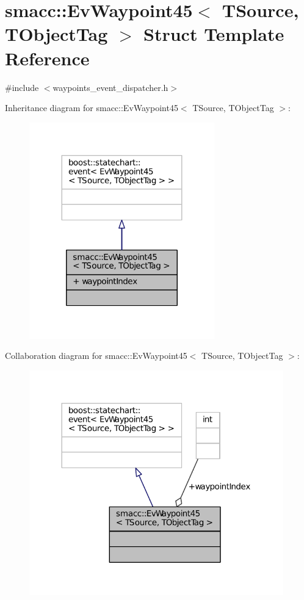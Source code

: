 \hypertarget{structsmacc_1_1EvWaypoint45}{}\section{smacc\+:\+:Ev\+Waypoint45$<$ T\+Source, T\+Object\+Tag $>$ Struct Template Reference}
\label{structsmacc_1_1EvWaypoint45}


{\ttfamily \#include $<$waypoints\+\_\+event\+\_\+dispatcher.\+h$>$}



Inheritance diagram for smacc\+:\+:Ev\+Waypoint45$<$ T\+Source, T\+Object\+Tag $>$\+:
\nopagebreak
\begin{figure}[H]
\begin{center}
\leavevmode
\includegraphics[width=227pt]{structsmacc_1_1EvWaypoint45__inherit__graph}
\end{center}
\end{figure}


Collaboration diagram for smacc\+:\+:Ev\+Waypoint45$<$ T\+Source, T\+Object\+Tag $>$\+:
\nopagebreak
\begin{figure}[H]
\begin{center}
\leavevmode
\includegraphics[width=312pt]{structsmacc_1_1EvWaypoint45__coll__graph}
\end{center}
\end{figure}
